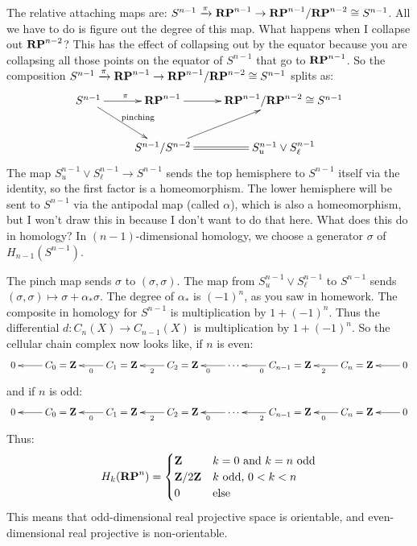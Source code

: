 The relative attaching maps are: $S^{n-1}\xrightarrow{\pi}\mathbf{RP}^{n-1}\to \mathbf{RP}^{n-1}/\mathbf{RP}^{n-2}\cong S^{n-1}$. All we have to do is figure out the degree of this map. What happens when I collapse out $\mathbf{RP}^{n-2}$? This has the effect of collapsing out by the equator because you are collapsing all those points on the equator of $S^{n-1}$ that go to $\mathbf{RP}^{n-1}$. So the composition $S^{n-1}\xrightarrow{\pi}\mathbf{RP}^{n-1}\to \mathbf{RP}^{n-1}/\mathbf{RP}^{n-2}\cong S^{n-1}$ splits as:
\begin{equation*}
\xymatrix{S^{n-1}\ar[r]^{\pi}\ar[dr]^{\text{pinching}} & \mathbf{RP}^{n-1}\ar[r] & \RP^{n-1}/\RP^{n-2}\cong S^{n-1}\\
 & S^{n-1}/S^{n-2}\ar[ur]\ar@{=}[r] & S^{n-1}_u\vee S^{n-1}_\ell}
\end{equation*}
The map $S^{n-1}_u\vee S^{n-1}_\ell\to S^{n-1}$ sends the top hemisphere to $S^{n-1}$ itself via the identity, so the first factor is a homeomorphism. The lower hemisphere will be sent to $S^{n-1}$ via the antipodal map (called $\alpha$), which is also a homeomorphism, but I won't draw this in because I don't want to do that here. What does this do in homology? In $(n-1)$-dimensional homology, we choose a generator $\sigma$ of $ H_{n-1}(S^{n-1})$.

The pinch map sends $\sigma$ to $(\sigma,\sigma)$. The map from $S^{n-1}_u\vee S^{n-1}_\ell$ to $S^{n-1}$ sends $(\sigma,\sigma)\mapsto \sigma+\alpha_\ast\sigma$. The degree of $\alpha_\ast$ is $(-1)^n$, as you saw in homework. The composite in homology for $S^{n-1}$ is multiplication by $1+(-1)^n$. Thus the differential $d:C_n(X)\to C_{n-1}(X)$ is multiplication by $1+(-1)^n$. So the cellular chain complex now looks like, if $n$ is even:
\begin{equation*}
\xymatrix{0 & C_0=\Z\ar[l] & C_1=\Z\ar[l]^0 & C_2=\Z \ar[l]^2 & \cdots\ar[l]^0 & C_{n-1}=\Z\ar[l]^0 & C_n=\Z\ar[l]^2 & 0\ar[l]}
\end{equation*}
and if $n$ is odd:
\begin{equation*}
\xymatrix{0 & C_0=\Z\ar[l] & C_1=\Z\ar[l]^0 & C_2=\Z \ar[l]^2 & \cdots\ar[l]^0 & C_{n-1}=\Z\ar[l]^2 & C_n=\Z\ar[l]^0 & 0\ar[l]}
\end{equation*}
Thus:
\begin{equation*}
 H_k(\mathbf{RP}^n)=\begin{cases}
\mathbf Z & k=0\text{ and }k=n\text{ odd}\\
\mathbf Z/2\mathbf Z & k\text{ odd, }0<k<n\\
0 & \text{else}
\end{cases}
\end{equation*}
This means that odd-dimensional real projective space is orientable, and even-dimensional real projective is non-orientable.
